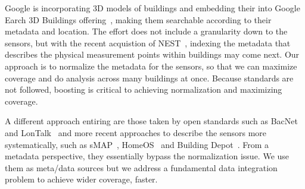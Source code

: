 Google is incorporating 3D models of buildings and embedding their into Google 
Earch 3D Buildings offering~\cite{google_3dbuildings}, making them searchable according 
to their metadata and location.
The effort does not include a granularity down to the sensors, but with the recent acquistion
of NEST~\cite{nest}, indexing the metadata that describes the physical measurement points
within buildings may come next.  Our approach is to normalize the metadata for the sensors,
so that we can maximize coverage and do analysis across many buildings at once.  Because standards
are not followed, boosting is critical to achieving normalization and maximizing coverage.

A different approach entiring are those taken by open standards such as BacNet and 
LonTalk~\cite{bacnet, lontalk} and more recent approaches to describe the sensors more
systematically, such as sMAP~\cite{smap}, HomeOS~\cite{homeos} and Building Depot~\cite{BDepot}.  From a metadata perspective, they
essentially bypass the normalization issue.  We use them as meta/data sources but we address a
fundamental data integration problem to achieve wider coverage, faster.
